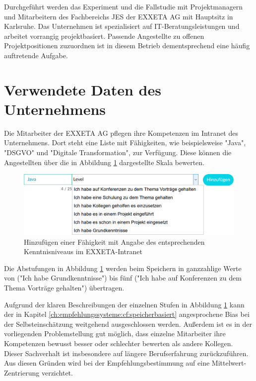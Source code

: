 Durchgeführt werden das Experiment und die Fallstudie mit Projektmanagern und Mitarbeitern des Fachbereichs \ac{JES} der EXXETA AG mit Hauptsitz in Karlsruhe. Das Unternehmen ist spezialisiert auf IT-Beratungsleistungen und arbeitet vorrangig projektbasiert. Passende Angestellte zu offenen Projektpositionen zuzuordnen ist in diesem Betrieb dementsprechend eine häufig auftretende Aufgabe.

\section{Verwendete Daten des Unternehmens}
\label{ch:methodik:versuchsaufbau}
Die Mitarbeiter der EXXETA AG pflegen ihre Kompetenzen im Intranet des Unternehmens. Dort steht eine Liste mit \anzFaehigkeiten Fähigkeiten, wie beispielsweise "Java", "DSGVO" und "Digitale Transformation", zur Verfügung. Diese können die Angestellten über die in Abbildung \ref{fig:methodik:versuchsaufbau:daten:abb1} dargestellte Skala bewerten.

\begin{figure}[h]
	\centering
	\includegraphics[width=1\textwidth]{gfx/skill-level.png}
	\caption{Hinzufügen einer Fähigkeit mit Angabe des entsprechenden Kenntnisniveaus im EXXETA-Intranet}
	\label{fig:methodik:versuchsaufbau:daten:abb1}
\end{figure}

Die Abstufungen in Abbildung \ref{fig:methodik:versuchsaufbau:daten:abb1} werden beim Speichern in ganzzahlige Werte von \nullWert ("Ich habe Grundkenntnisse") bis fünf ("Ich habe auf Konferenzen zu dem Thema Vorträge gehalten") übertragen.

Aufgrund der klaren Beschreibungen der einzelnen Stufen in Abbildung \ref{fig:methodik:versuchsaufbau:daten:abb1} kann der in Kapitel \ref{ch:empfehlungssysteme:cf:speicherbasiert} angesprochene Bias bei der Selbsteinschätzung weitgehend ausgeschlossen werden. Außerdem ist es in der vorliegenden Problemstellung gut möglich, dass einzelne Mitarbeiter ihre Kompetenzen bewusst besser oder schlechter bewerten als andere Kollegen. Dieser Sachverhalt ist insbesondere auf längere Berufserfahrung zurückzuführen. Aus diesen Gründen wird bei der Empfehlungsbestimmung auf eine Mittelwert-Zentrierung verzichtet.

